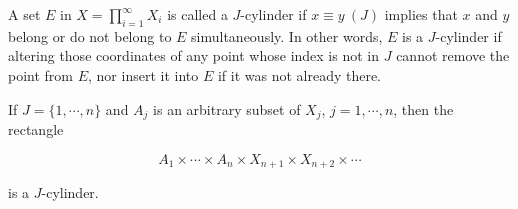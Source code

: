 A set $E$ in $X = \prod_{i=1}^{\infty} X_i$ is called a $J$-cylinder if $x \equiv y \ (J)$ implies that $x$ and $y$ belong or do not belong to $E$ simultaneously. In other words, $E$ is a $J$-cylinder if altering those coordinates of any point whose index is not in $J$ cannot remove the point from $E$, nor insert it into $E$ if it was not already there.

If $J = \{1, \cdots, n\}$ and $A_j$ is an arbitrary subset of $X_j$, $j = 1, \cdots, n$, then the rectangle

$$A_1 \times \cdots \times A_n \times X_{n+1} \times X_{n+2} \times \cdots$$

is a $J$-cylinder.
